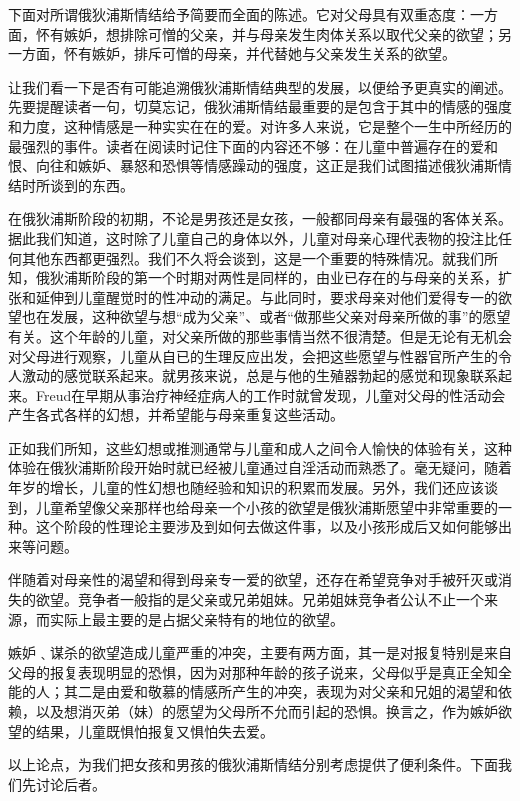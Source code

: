 \documentclass[UTF8,10pt,a4paper,openany]{book}
\begin{document}
下面对所谓俄狄浦斯情结给予简要而全面的陈述。它对父母具有双重态度：一方面，怀有嫉妒，想排除可憎的父亲，并与母亲发生肉体关系以取代父亲的欲望；另一方面，怀有嫉妒，排斥可憎的母亲，并代替她与父亲发生关系的欲望。

让我们看一下是否有可能追溯俄狄浦斯情结典型的发展，以便给予更真实的阐述。先要提醒读者一句，切莫忘记，俄狄浦斯情结最重要的是包含于其中的情感的强度和力度，这种情感是一种实实在在的爱。对许多人来说，它是整个一生中所经历的最强烈的事件。读者在阅读时记住下面的内容还不够：在儿童中普遍存在的爱和恨、向往和嫉妒、暴怒和恐惧等情感躁动的强度，这正是我们试图描述俄狄浦斯情结时所谈到的东西。

在俄狄浦斯阶段的初期，不论是男孩还是女孩，一般都同母亲有最强的客体关系。据此我们知道，这时除了儿童自己的身体以外，儿童对母亲心理代表物的投注比任何其他东西都更强烈。我们不久将会谈到，这是一个重要的特殊情况。就我们所知，俄狄浦斯阶段的第一个时期对两性是同样的，由业已存在的与母亲的关系，扩张和延伸到儿童醒觉时的性冲动的满足。与此同时，要求母亲对他们爱得专一的欲望也在发展，这种欲望与想“成为父亲”、或者“做那些父亲对母亲所做的事”的愿望有关。这个年龄的儿童，对父亲所做的那些事情当然不很清楚。但是无论有无机会对父母进行观察，儿童从自已的生理反应出发，会把这些愿望与性器官所产生的令人激动的感觉联系起来。就男孩来说，总是与他的生殖器勃起的感觉和现象联系起来。Freud在早期从事治疗神经症病人的工作时就曾发现，儿童对父母的性活动会产生各式各样的幻想，并希望能与母亲重复这些活动。

正如我们所知，这些幻想或推测通常与儿童和成人之间令人愉快的体验有关，这种体验在俄狄浦斯阶段开始时就已经被儿童通过自淫活动而熟悉了。毫无疑问，随着年岁的增长，儿童的性幻想也随经验和知识的积累而发展。另外，我们还应该谈到，儿童希望像父亲那样也给母亲一个小孩的欲望是俄狄浦斯愿望中非常重要的一种。这个阶段的性理论主要涉及到如何去做这件事，以及小孩形成后又如何能够出来等问题。

伴随着对母亲性的渴望和得到母亲专一爱的欲望，还存在希望竞争对手被歼灭或消失的欲望。竞争者一般指的是父亲或兄弟姐妹。兄弟姐妹竞争者公认不止一个来源，而实际上最主要的是占据父亲特有的地位的欲望。

嫉妒﹑谋杀的欲望造成儿童严重的冲突，主要有两方面，其一是对报复特别是来自父母的报复表现明显的恐惧，因为对那种年龄的孩子说来，父母似乎是真正全知全能的人；其二是由爱和敬慕的情感所产生的冲突，表现为对父亲和兄姐的渴望和依赖，以及想消灭弟（妹）的愿望为父母所不允而引起的恐惧。换言之，作为嫉妒欲望的结果，儿童既惧怕报复又惧怕失去爱。

以上论点，为我们把女孩和男孩的俄狄浦斯情结分别考虑提供了便利条件。下面我们先讨论后者。
\end{document}
